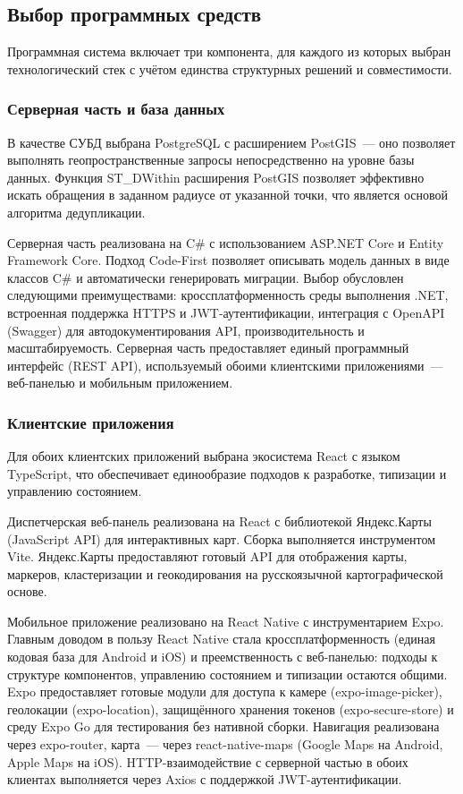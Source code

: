 \subsection{Выбор программных средств}

Программная система включает три компонента, для каждого из которых выбран технологический стек с учётом единства структурных решений и совместимости.

\subsubsection{Серверная часть и база данных}

В качестве СУБД выбрана PostgreSQL с расширением PostGIS~--- оно позволяет выполнять геопространственные запросы непосредственно на уровне базы данных. Функция ST\_DWithin расширения PostGIS позволяет эффективно искать обращения в заданном радиусе от указанной точки, что является основой алгоритма дедупликации.

Серверная часть реализована на C\# с использованием ASP.NET Core и Entity Framework Core. Подход Code-First позволяет описывать модель данных в виде классов C\# и автоматически генерировать миграции. Выбор обусловлен следующими преимуществами: кроссплатформенность среды выполнения .NET, встроенная поддержка HTTPS и JWT-аутентификации, интеграция с OpenAPI (Swagger) для автодокументирования API, производительность и масштабируемость. Серверная часть предоставляет единый программный интерфейс (REST API), используемый обоими клиентскими приложениями~--- веб-панелью и мобильным приложением.

\subsubsection{Клиентские приложения}

Для обоих клиентских приложений выбрана экосистема React с языком TypeScript, что обеспечивает единообразие подходов к разработке, типизации и управлению состоянием.

Диспетчерская веб-панель реализована на React с библиотекой Яндекс.Карты (JavaScript API) для интерактивных карт. Сборка выполняется инструментом Vite. Яндекс.Карты предоставляют готовый API для отображения карты, маркеров, кластеризации и геокодирования на русскоязычной картографической основе.

Мобильное приложение реализовано на React Native с инструментарием Expo. Главным доводом в пользу React Native стала кроссплатформенность (единая кодовая база для Android и iOS) и преемственность с веб-панелью: подходы к структуре компонентов, управлению состоянием и типизации остаются общими. Expo предоставляет готовые модули для доступа к камере (expo-image-picker), геолокации (expo-location), защищённого хранения токенов (expo-secure-store) и среду Expo Go для тестирования без нативной сборки. Навигация реализована через expo-router, карта~--- через react-native-maps (Google Maps на Android, Apple Maps на iOS). HTTP-взаимодействие с серверной частью в обоих клиентах выполняется через Axios с поддержкой JWT-аутентификации.
